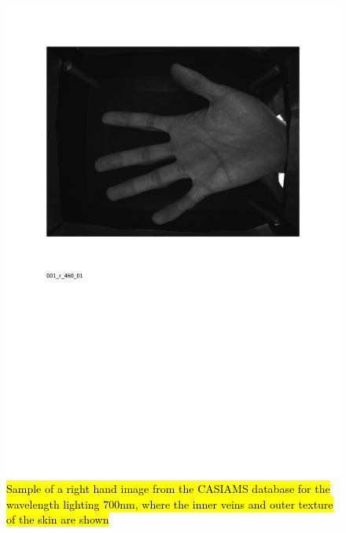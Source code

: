 \documentclass[review]{elsarticle}
\begin{document}
		\begin{figure}[!h]
		    \centering
		    \includegraphics[page=3,scale=.57,trim=1cm 14.7cm 1cm 1.7cm,clip]{CASIA_multi_spectral_samples.pdf}
		    \caption{\hl{Sample of a right hand image from the CASIAMS database for the wavelength lighting 700nm, where the inner veins and outer texture of the skin are shown}}
		    \label{fig:IIT_problematic_rings3}
		\end{figure}
\end{document}
